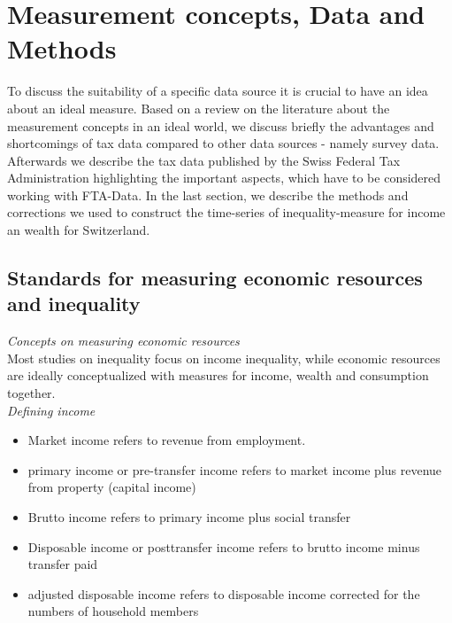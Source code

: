 
\section{Measurement concepts, Data and Methods}

To discuss the suitability of a specific data source it is crucial to have an idea about an ideal measure. Based on a review on the literature about the measurement concepts in an ideal world, we discuss briefly the advantages and shortcomings of tax data compared to other data sources - namely survey data. Afterwards we describe the tax data published by the Swiss Federal Tax Administration highlighting the important aspects, which have to be considered working with FTA-Data. In the last section, we describe the methods and corrections we used to construct the time-series of inequality-measure for income an wealth for Switzerland.

\subsection{Standards for measuring economic resources and inequality}

\emph{Concepts on measuring economic resources}  \\
Most studies on inequality focus on income inequality, while economic resources are ideally conceptualized with measures for income, wealth and consumption together. \\


\emph{Defining income}

\begin{itemize}
\item Market income refers to revenue from employment.
\item primary income or pre-transfer income refers to  market income plus revenue from property (capital income)
\item Brutto income refers to  primary income plus social transfer
\item Disposable income or posttransfer income refers to  brutto income minus transfer paid 
\item adjusted disposable income refers to  disposable income corrected for the numbers of household members 
\end{itemize}

